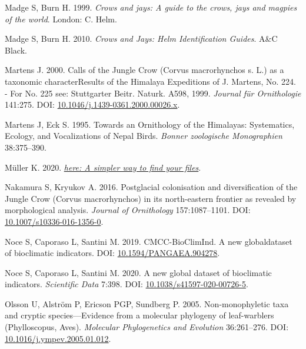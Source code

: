 \documentclass[10pt,a4paper]{article}
\newlength{\cslhangindent}
\newenvironment{CSLReferences}[2] %
 {\begin{list}{}{%
  \setlength{\itemindent}{0pt}
  \setlength{\leftmargin}{0pt}
  \setlength{\parsep}{0pt}
  \ifodd #1
   \setlength{\leftmargin}{\cslhangindent}
   \setlength{\itemindent}{-1\cslhangindent}
  \fi
  \setlength{\itemsep}{#2\baselineskip}}}
 {\end{list}}
\begin{document}
\begin{CSLReferences}{1}{0}
Madge S, Burn H. 1999. \emph{Crows and jays: A guide to the crows, jays and magpies of the world}. London: C. Helm.

Madge S, Burn H. 2010. \emph{Crows and {Jays}: {Helm} {Identification} {Guides}}. A\&C Black.

Martens J. 2000. Calls of the {Jungle} {Crow} ({Corvus} macrorhynchos s. L.) as a taxonomic {characterResults} of the {Himalaya} {Expeditions} of {J}. {Martens}, {No}. 224. - {For} {No}. 225 see: {Stuttgarter} {Beitr}. {Naturk}. {A598}, 1999. \emph{Journal für Ornithologie} 141:275. DOI: \href{https://doi.org/10.1046/j.1439-0361.2000.00026.x}{10.1046/j.1439-0361.2000.00026.x}.

Martens J, Eck S. 1995. Towards an {Ornithology} of the {Himalayas}: {Systematics}, {Ecology}, and {Vocalizations} of {Nepal} {Birds}. \emph{Bonner zoologische Monographien} 38:375--390.

Müller K. 2020. \emph{\href{https://CRAN.R-project.org/package=here}{{here}: A simpler way to find your files}}.

Nakamura S, Kryukov A. 2016. Postglacial colonisation and diversification of the {Jungle} {Crow} ({Corvus} macrorhynchos) in its north-eastern frontier as revealed by morphological analysis. \emph{Journal of Ornithology} 157:1087--1101. DOI: \href{https://doi.org/10.1007/s10336-016-1356-0}{10.1007/s10336-016-1356-0}.

Noce S, Caporaso L, Santini M. 2019. {CMCC}-{BioClimInd}. {A} new globaldataset of bioclimatic indicators. DOI: \href{https://doi.org/10.1594/PANGAEA.904278}{10.1594/PANGAEA.904278}.

Noce S, Caporaso L, Santini M. 2020. A new global dataset of bioclimatic indicators. \emph{Scientific Data} 7:398. DOI: \href{https://doi.org/10.1038/s41597-020-00726-5}{10.1038/s41597-020-00726-5}.

Olsson U, Alström P, Ericson PGP, Sundberg P. 2005. Non-monophyletic taxa and cryptic species---{Evidence} from a molecular phylogeny of leaf-warblers ({Phylloscopus}, {Aves}). \emph{Molecular Phylogenetics and Evolution} 36:261--276. DOI: \href{https://doi.org/10.1016/j.ympev.2005.01.012}{10.1016/j.ympev.2005.01.012}.


\end{CSLReferences}
\end{document}
